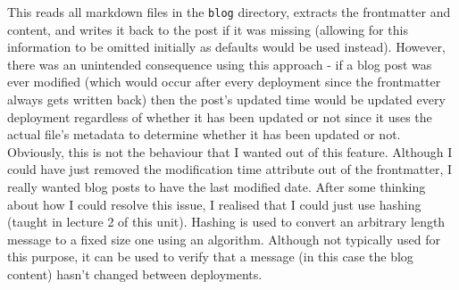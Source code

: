 \documentclass[titlepage]{article}
\begin{document}
        This reads all markdown files in the \texttt{blog} directory, extracts
        the frontmatter and content, and writes it back to the post if it was
        missing (allowing for this information to be omitted initially as
        defaults would be used instead). However, there was an unintended
        consequence using this approach - if a blog post was ever modified
        (which would occur after every deployment since the frontmatter always
        gets written back) then the post's updated time would be updated every
        deployment regardless of whether it has been updated or not since it
        uses the actual file's metadata to determine whether it has been updated
        or not. Obviously, this is not the behaviour that I wanted out of this
        feature. Although I could have just removed the modification time
        attribute out of the frontmatter, I really wanted blog posts to have the
        last modified date. After some thinking about how I could resolve this
        issue, I realised that I could just use hashing (taught in lecture 2 of
        this unit). Hashing is used to convert an arbitrary length message to a
        fixed size one using an algorithm. Although not typically used for this
        purpose, it can be used to verify that a message (in this case the blog
        content) hasn't changed between deployments.

        \vspace{0.5em}
\end{document}
